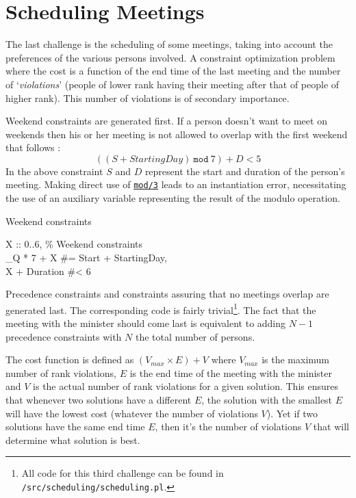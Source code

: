 \section{Scheduling Meetings}

The last challenge is the scheduling of some meetings, taking into account the preferences of the various persons involved. A constraint optimization problem where the cost is a function of the end time of the last meeting and the number of `\textit{violations}' (people of lower rank having their meeting after that of people of higher rank). This number of violations is of secondary importance.\\\par

Weekend constraints are generated first. If a person doesn't want to meet on weekends then his or her meeting is not allowed to overlap with the first weekend that follows :
$$((S + \textit{StartingDay})\ \texttt{mod}\ 7) + D <  5$$
In the above constraint $S$ and $D$ represent the start and duration of the person's meeting. Making direct use of \href{https://www.eclipseclp.org/doc/bips/kernel/arithmetic/mod-3.html}{\texttt{mod/3}} leads to an instantiation error, necessitating the use of an auxiliary variable representing the result of the modulo operation.

\begin{snippet}[H]
\caption{Weekend constraints}\label{weekend}
\small
X :: 0..6, \% Weekend constraints\\
\_Q * 7 + X \#= Start + StartingDay,\\
X + Duration \#< 6
\end{snippet}

Precedence constraints and constraints assuring that no meetings overlap are generated last. The corresponding code is fairly trivial\footnote{All code for this third challenge can be found in \texttt{/src/scheduling/scheduling.pl}.}. The fact that the meeting with the minister should come last is equivalent to adding $N-1$ precedence constraints with $N$ the total number of persons.\\\par

The cost function is defined as $(V_{max}\times E)+V$ where $V_{max}$ is the maximum number of rank violations, $E$ is the end time of the meeting with the minister and $V$ is the actual number of rank violations for a given solution. This ensures that whenever two solutions have a different $E$, the solution with the smallest $E$ will have the lowest cost (whatever the number of violations $V$). Yet if two solutions have the same end time $E$, then it's the number of violations $V$ that will determine what solution is best.

